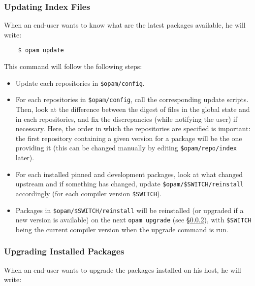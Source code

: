 \documentclass[a4paper,10pt]{article}
\begin{document}
\subsubsection{Updating Index Files}
\label{opam-update}

When an end-user wants to know what are the latest packages available,
he will write:

\begin{verbatim}
    $ opam update
\end{verbatim}

This command will follow the following steps:

\begin{itemize}

\item Update each repositories in \verb+$opam/config+.

\item For each repositories in \verb+$opam/config+, call the
  corresponding update scripts. Then, look at the difference between
  the digest of files in the global state and in each repositories,
  and fix the discrepancies (while notifying the user) if necessary.
  Here, the order in which the repositories are specified
  is important: the first repository containing a given version for a
  package will be the one providing it (this can be changed manually
  by editing \verb+$opam/repo/index+ later).

\item For each installed pinned and development packages, look at what
  changed upstream and if something has changed, update
  \verb+$opam/$SWITCH/reinstall+ accordingly (for each compiler
  version \verb+$SWITCH+).

\item Packages in \verb+$opam/$SWITCH/reinstall+ will be reinstalled (or
  upgraded if a new version is available) on the next {\tt opam
    upgrade} (see \S\ref{opam-upgrade}), with \verb+$SWITCH+ being
  the current compiler version when the upgrade command is run.

\end{itemize}

\subsubsection{Upgrading Installed Packages}
\label{opam-upgrade}

When an end-user wants to upgrade the packages installed on his host,
he will write:
\end{document}
